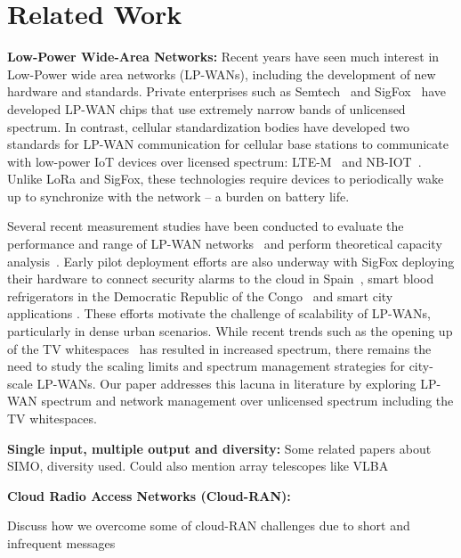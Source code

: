 \section{Related Work}
\label{sec:related-work}



\noindent \textbf{Low-Power Wide-Area Networks: } Recent years have seen much interest in Low-Power wide area networks (LP-WANs), including the development of new hardware and standards. Private enterprises such as Semtech~\cite{Sornin2015, LoRaWanAlliance2015} and SigFox~\cite{sanchez2016state} have developed LP-WAN chips that use extremely narrow bands of unlicensed spectrum. In contrast, cellular standardization bodies have developed two standards for LP-WAN communication for cellular base stations to communicate with low-power IoT devices over licensed spectrum: LTE-M~\cite{GSMAssociation2016} and NB-IOT~\cite{Ratasuk2016}. Unlike LoRa and SigFox, these technologies require devices to periodically wake up to synchronize with the network -- a burden on battery life.

Several recent measurement studies have been conducted to evaluate the performance and range of LP-WAN networks~\cite{petric2016measurements, 7499263, toldov2016performance} and perform theoretical capacity analysis~\cite{mikhaylov2016analysis}. Early pilot deployment efforts are also underway with SigFox deploying their hardware to connect security alarms to the cloud in Spain~\cite{sanchez2016state}, smart blood refrigerators in the Democratic Republic of the Congo~\cite{ramachandranmupnp} and smart city applications \cite{centenaro2015long}. These efforts motivate the challenge of scalability of LP-WANs, particularly in dense urban scenarios. While recent trends such as the opening up of the TV whitespaces~\cite{FCC_Whitespaces} has resulted in increased spectrum, there remains the need to study the scaling limits and spectrum management strategies for city-scale LP-WANs. Our paper addresses this lacuna in literature by exploring LP-WAN spectrum and network management over unlicensed spectrum including the TV whitespaces. \\\vspace*{-0.1in}

\noindent \textbf{Single input, multiple output and diversity: } Some related papers about SIMO, diversity used. Could also mention array telescopes like VLBA

\noindent \textbf{Cloud Radio Access Networks (Cloud-RAN): }

{\color{blue} Discuss how we overcome some of cloud-RAN challenges due to short and infrequent messages}